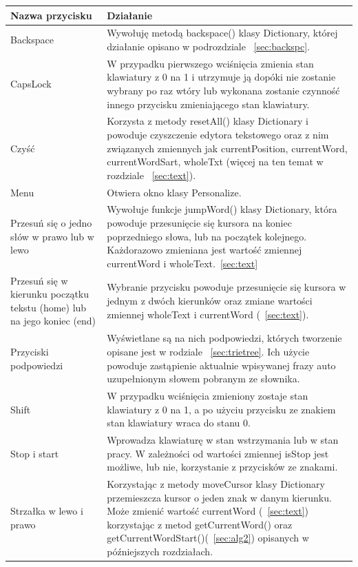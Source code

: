 \documentclass[twoside,a4paper]{book}
\begin{document}
\begin{table}
  \renewcommand\arraystretch{1.2}
 \centering
    \begin{tabular}{|>{\centering\arraybackslash}m{4cm}|m{8.5cm}|}
        \hline
    \textbf{Nazwa przycisku} & \textbf{Działanie}\\ \hline
     Backspace & Wywołuję metodą backspace() klasy Dictionary, której działanie opisano w podrozdziale ~\ref{sec:backspc}.\\ \hline
    CapsLock & W przypadku pierwszego wciśnięcia zmienia stan kla\-wia\-tu\-ry z 0 na 1 i utrzymuje ją dopóki nie zostanie wybrany po raz wtóry lub wykonana zostanie czynność innego przycisku zmieniającego stan klawiatury. \\ \hline
 Czyść & Korzysta z metody resetAll() klasy \-Dictionary i po\-wo\-du\-je czyszczenie edytora tekstowego oraz z nim związanych zmiennych jak currentPosition, currentWord, currentWordSart, wholeTxt (więcej na ten temat w rozdziale ~\ref{sec:text}).\\ \hline
Menu & Otwiera okno klasy Personalize.\\ \hline
Przesuń się o jedno słów w prawo lub w lewo & Wywołuje funkcje jumpWord() klasy Dictionary, która powoduje przesunięcie się kursora na koniec po\-prze\-dnie\-go słowa, lub na początek kolejnego. Każdorazowo zmieniana jest wartość zmie\-nnej currentWord i wholeText.~\ref{sec:text}\\ \hline
 Przesuń się w kierunku początku tekstu (home) lub na jego koniec (end) & Wybranie przycisku powoduje przesunięcie się kursora w jednym z dwóch kierunków oraz zmiane wartości zmie\-nnej wholeText i currentWord (~\ref{sec:text}). \\ \hline
 Przyciski podpowiedzi & Wyświetlane są na nich podpowiedzi, których tworzenie opisane jest w rodziale ~\ref{sec:trietree}. Ich użycie powoduje zastąpienie aktualnie wpisywanej frazy auto uzupełnionym słowem pobranym ze słownika. \\ \hline
  Shift & W przypadku wciśnięcia zmieniony zostaje stan kla\-wia\-tu\-ry z 0 na 1, a po użyciu przycisku ze znakiem stan kla\-wia\-tu\-ry wraca do stanu 0. \\ \hline
   Stop i start & Wprowadza kla\-wia\-tu\-rę w stan wstrzymania lub w stan pracy. W zależności od wartości zmiennej isStop jest możliwe, lub nie, korzystanie z przycisków ze znakami.\\ \hline
   Strzałka w lewo i prawo &  Korzystając z metody moveCursor klasy Dictionary przemieszcza kursor o jeden znak w danym kierunku. Może zmienić wartość currentWord (~\ref{sec:text}) korzystając z metod getCurrentWord() oraz getCurrentWordStart()(~\ref{sec:alg2}) opisanych w późniejszych rozdziałach.\\ \hline

\end{tabular}
\end{table}
\end{document}
